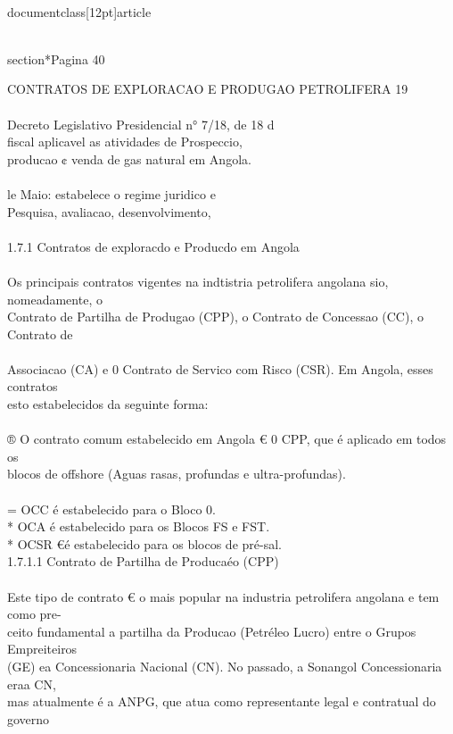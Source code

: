 \\documentclass[12pt]{article}
\begin{document}
\\section*{Pagina 40}

CONTRATOS DE EXPLORACAO E PRODUGAO PETROLIFERA 19\\
\\
Decreto Legislativo Presidencial n° 7/18, de 18 d\\
fiscal aplicavel as atividades de Prospeccio,\\
producao ¢ venda de gas natural em Angola.\\
\\
le Maio: estabelece o regime juridico e\\
Pesquisa, avaliacao, desenvolvimento,\\
\\
1.7.1 Contratos de exploracdo e Producdo em Angola\\
\\
Os principais contratos vigentes na indtistria petrolifera angolana sio, nomeadamente, o\\
Contrato de Partilha de Produgao (CPP), o Contrato de Concessao (CC), o Contrato de\\
\\
Associacao (CA) e 0 Contrato de Servico com Risco (CSR). Em Angola, esses contratos\\
esto estabelecidos da seguinte forma:\\
\\
® O contrato comum estabelecido em Angola € 0 CPP, que é aplicado em todos os\\
blocos de offshore (Aguas rasas, profundas e ultra-profundas).\\
\\
= OCC é estabelecido para o Bloco 0.\\
* OCA é estabelecido para os Blocos FS e FST.\\
* OCSR €é estabelecido para os blocos de pré-sal.\\
1.7.1.1 Contrato de Partilha de Producaéo (CPP)\\
\\
Este tipo de contrato € o mais popular na industria petrolifera angolana e tem como pre-\\
ceito fundamental a partilha da Producao (Petréleo Lucro) entre o Grupos Empreiteiros\\
(GE) ea Concessionaria Nacional (CN). No passado, a Sonangol Concessionaria eraa CN,\\
mas atualmente é a ANPG, que atua como representante legal e contratual do governo\\
\end{document}
